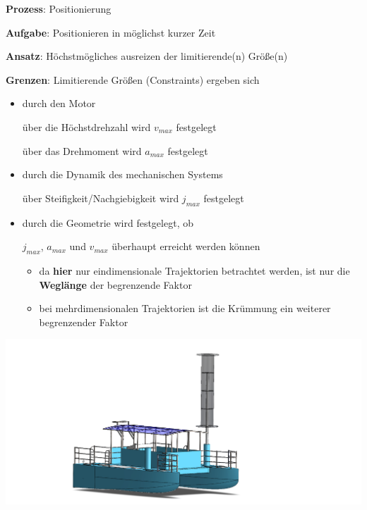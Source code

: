 { 

  \textbf{Prozess}: Positionierung

  \textbf{Aufgabe}: Positionieren in möglichst kurzer Zeit

  \textbf{Ansatz}: Höchstmögliches ausreizen der limitierende(n) Größe(n)

  \textbf{Grenzen}: Limitierende Größen (Constraints) ergeben sich

  \begin{itemize}
    \item durch den Motor
          
          über die Höchstdrehzahl wird $v_{max}$ festgelegt
          
          über das Drehmoment wird $a_{max}$ festgelegt
    \item durch die Dynamik des mechanischen Systems
          
          über Steifigkeit/Nachgiebigkeit wird $j_{max}$ festgelegt
    \item durch die Geometrie wird festgelegt, ob
          
          $j_{max}$, $a_{max}$ und $v_{max}$ überhaupt erreicht werden können
      \begin{itemize}
        \item da \textbf{hier} nur eindimensionale Trajektorien betrachtet werden, ist nur die \textbf{Weglänge} der begrenzende Faktor
        \item bei mehrdimensionalen Trajektorien ist die Krümmung ein weiterer begrenzender Faktor
      \end{itemize}
  \end{itemize}
}

{
  \begin{center}
    \includegraphics[width=\textwidth]{images/WaterTaxi}
  \end{center}	
}

